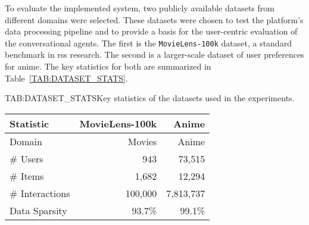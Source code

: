 To evaluate the implemented system, two publicly available datasets from different domains were selected. These datasets were chosen to test the platform's data processing pipeline and to provide a basis for the user-centric evaluation of the conversational agents. The first is the \texttt{MovieLens-100k} dataset, a standard benchmark in \aclp{rs} research. The second is a larger-scale dataset of user preferences for anime. The key statistics for both are summarized in Table~\ref{TAB:DATASET_STATS}.

\begin{table}[Datasets Statistics]{TAB:DATASET_STATS}{Key statistics of the datasets used in the experiments.}
    \begin{tabular}{l r r}
        \hline
        \textbf{Statistic} & \textbf{MovieLens-100k} & \textbf{Anime} \\
        \hline
        Domain & Movies & Anime \\
        \# Users & 943 & 73,515 \\
        \# Items & 1,682 & 12,294 \\
        \# Interactions & 100,000 & 7,813,737 \\
        Data Sparsity & 93.7\% & 99.1\% \\
        \hline
    \end{tabular}
\end{table}